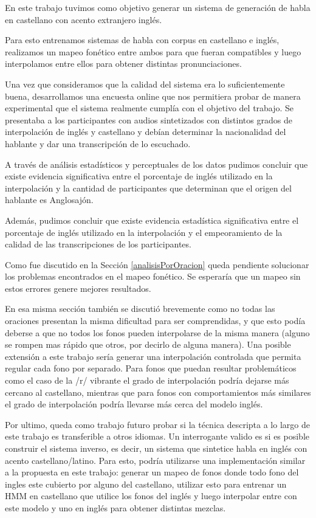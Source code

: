 En este trabajo tuvimos como objetivo generar un sistema de generación de habla en castellano con acento extranjero inglés.

Para esto entrenamos sistemas de habla con corpus en castellano e inglés, realizamos un mapeo fonético entre ambos para que fueran compatibles y luego interpolamos entre ellos para obtener distintas pronunciaciones.

Una vez que consideramos que la calidad del sistema era lo suficientemente buena, desarrollamos una encuesta online que nos permitiera probar de manera experimental que el sistema realmente cumplía con el objetivo del trabajo. Se presentaba a los participantes con audios sintetizados con distintos grados de interpolación de inglés y castellano y debían determinar la nacionalidad del hablante y dar una transcripción de lo escuchado.

A través de análisis estadísticos y perceptuales de los datos pudimos concluir que existe evidencia significativa entre el porcentaje de inglés utilizado en la interpolación y la cantidad de participantes que determinan que el origen del hablante es Anglosajón.

Además, pudimos concluir que existe evidencia estadística significativa entre el porcentaje de inglés utilizado en la interpolación y el empeoramiento de la calidad de las transcripciones de los participantes.

Como fue discutido en la Sección \ref{analisisPorOracion} queda pendiente solucionar los problemas encontrados en el mapeo fonético. Se esperaría que un mapeo sin estos errores genere mejores resultados.

En esa misma sección también se discutió brevemente como no todas las oraciones presentan la misma dificultad para ser comprendidas, y que esto podía deberse a que no todos los fonos pueden interpolarse de la misma manera (alguno se rompen mas rápido que otros, por decirlo de alguna manera). Una posible extensión a este trabajo sería generar una interpolación controlada que permita regular cada fono por separado. Para fonos que puedan resultar problemáticos como el caso de la /r/ vibrante el grado de interpolación podría dejarse más cercano al castellano, mientras que para fonos con comportamientos más similares el grado de interpolación podría llevarse más cerca del modelo inglés.

Por ultimo, queda como trabajo futuro probar si la técnica descripta a lo largo de este trabajo es transferible a otros idiomas. Un interrogante valido es si es posible construir el sistema inverso, es decir, un sistema que sintetice habla en inglés con acento castellano/latino. Para esto, podría utilizarse una implementación similar a la propuesta en este trabajo: generar un mapeo de fonos donde todo fono del ingles este cubierto por alguno del castellano, utilizar esto para entrenar un HMM en castellano que utilice los fonos del inglés y luego interpolar entre con este modelo y uno en inglés para obtener distintas mezclas.